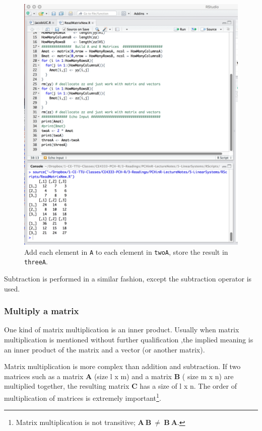 \begin{figure}[h!] %
   \centering
   \includegraphics[width=6in]{./5-LinearSystems/AddMatrix.jpg} 
   \caption{Add each element in \texttt{A} to each element in \texttt{twoA}, store the result in \texttt{threeA}.}
   \label{fig:AddMatrix}
\end{figure}

Subtraction is performed in a similar fashion, except the subtraction operator is used.  
\clearpage
\subsubsection{Multiply a matrix}
One kind of matrix multiplication is an inner product.  
Usually when matrix multiplication is mentioned without further qualification ,the implied meaning is an inner product of the matrix and a vector (or another matrix).

Matrix multiplication is  more complex than addition and subtraction.  
If two matrices such as a matrix $\mathbf{A}$ (size l x m) and a matrix $\mathbf{B}$ ( size m x n) are multiplied together, the resulting matrix $\mathbf{C}$ has a size of l x n.  
The order of multiplication of matrices is extremely important\footnote{Matrix multiplication is not  transitive;  $\mathbf{A}~\mathbf{B} ~\ne~  \mathbf{B}~\mathbf{A}$.}.  

